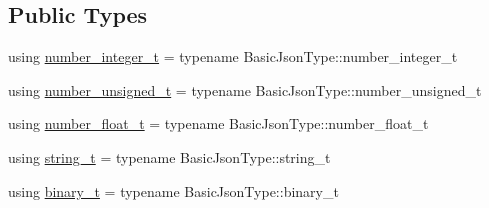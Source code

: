 \subsection*{Public Types}
\begin{DoxyCompactItemize}
\item 
using \hyperlink{classnlohmann_1_1detail_1_1json__sax__dom__parser_a3d5cd67d179aa7422ce90e54984a441e}{number\+\_\+integer\+\_\+t} = typename Basic\+Json\+Type\+::number\+\_\+integer\+\_\+t
\item 
using \hyperlink{classnlohmann_1_1detail_1_1json__sax__dom__parser_a90f19b272530a479db81db11be2ea15c}{number\+\_\+unsigned\+\_\+t} = typename Basic\+Json\+Type\+::number\+\_\+unsigned\+\_\+t
\item 
using \hyperlink{classnlohmann_1_1detail_1_1json__sax__dom__parser_ad8da3aad0147b18b3cb76868480300fe}{number\+\_\+float\+\_\+t} = typename Basic\+Json\+Type\+::number\+\_\+float\+\_\+t
\item 
using \hyperlink{classnlohmann_1_1detail_1_1json__sax__dom__parser_afd4d961ab2a6b01cbe6e840f7fb90cdc}{string\+\_\+t} = typename Basic\+Json\+Type\+::string\+\_\+t
\item 
using \hyperlink{classnlohmann_1_1detail_1_1json__sax__dom__parser_a188c267325965fdbe487ce68ab5496aa}{binary\+\_\+t} = typename Basic\+Json\+Type\+::binary\+\_\+t
\end{DoxyCompactItemize}
